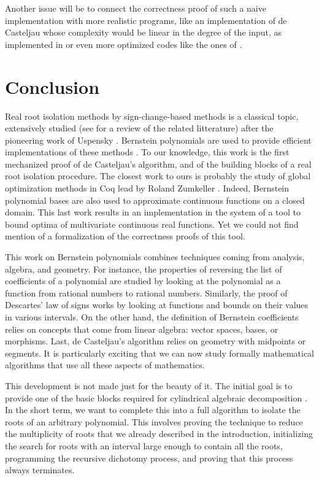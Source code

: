 \documentclass{mscs}
\begin{document}
Another issue will be to connect the correctness proof of such a
naive implementation with more realistic programs, like an
implementation of de Casteljau whose complexity would be
linear in the degree of the input, as
implemented in \cite{cadcoq} or even more optimized codes like the
ones of \cite{mourrainetal}.

\section{Conclusion}

Real root isolation methods by sign-change-based methods is a
classical topic, extensively studied (see \cite{rouillieretal} for a
review of the related litterature) after the pioneering work of
Uspensky \cite{uspensky}. Bernstein polynomials are used to provide
efficient implementations of these methods
\cite{mourrainetal, rouillieretal}.  To our knowledge, this work is
the first mechanized proof of de Casteljau's algorithm, and of the
building blocks of a real root isolation procedure. The closest work
to ours is probably the study of global optimization methods in Coq
lead by Roland Zumkeller \cite{zumkellerphd}. Indeed, Bernstein
polynomial bases are also used to approximate continuous functions on a
closed domain. This last work results in an implementation in the
\Coq{} system of a tool to bound optima of multivariate continuous real
functions. Yet we could not find mention of a formalization of the
correctness proofs of this tool.

This work on Bernstein polynomials combines techniques coming from
analysis, algebra, and geometry. For instance, the properties of
reversing the list of coefficients of a polynomial are studied by
looking at the polynomial as a function from rational numbers to
rational numbers. Similarly, the proof of Descartes' law of signs
works by looking at functions and bounds on their values in various
intervals. On the other hand, the definition of Bernstein coefficients
relies on concepts that come from linear algebra: vector spaces,
bases, or morphisms. Last, de Casteljau's algorithm relies on geometry
with midpoints or segments. It is particularly exciting that we can
now study formally mathematical algorithms that use all these aspects
of mathematics.

This development is not made just for the beauty of it. The initial
goal is to provide one of the basic blocks required for cylindrical
algebraic decomposition \cite{bpr, cadcoq}. In the short term, we
want to complete this
into a full algorithm to isolate the roots of an arbitrary
polynomial. This involves proving the technique to reduce the
multiplicity of roots that we already described in the introduction,
initializing the search for roots with an interval large enough to
contain all the roots, programming the recursive dichotomy process,
and proving that this process always terminates.
\end{document}
